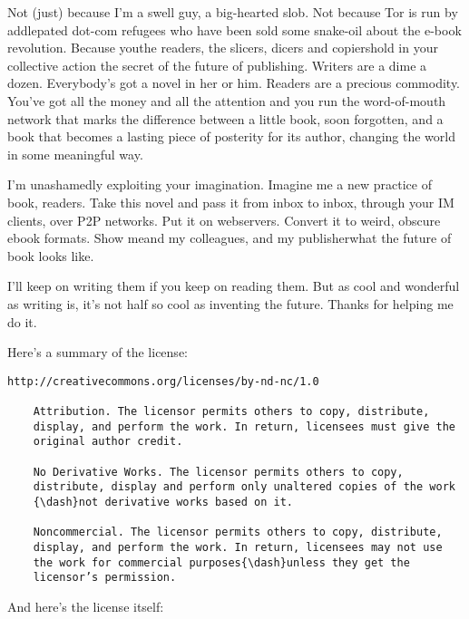 Not (just) because I’m a swell guy, a big-hearted slob. Not because
Tor is run by addlepated dot-com refugees who have been sold some
snake-oil about the e-book revolution. Because you{\dash}the readers, the
slicers, dicers and copiers{\dash}hold in your collective action the
secret of the future of publishing. Writers are a dime a dozen.
Everybody’s got a novel in her or him. Readers are a precious
commodity. You’ve got all the money and all the attention and you
run the word-of-mouth network that marks the difference between a
little book, soon forgotten, and a book that becomes a lasting
piece of posterity for its author, changing the world in some
meaningful way.

I’m unashamedly exploiting your imagination. Imagine me a new
practice of book, readers. Take this novel and pass it from inbox
to inbox, through your IM clients, over P2P networks. Put it on
webservers. Convert it to weird, obscure ebook formats. Show me{\dash}and
my colleagues, and my publisher{\dash}what the future of book looks
like.

I’ll keep on writing them if you keep on reading them. But as cool
and wonderful as writing is, it’s not half so cool as inventing the
future. Thanks for helping me do it.

Here’s a summary of the license:

\begin{Verbatim}[fontsize=\footnotesize]
    http://creativecommons.org/licenses/by-nd-nc/1.0
    
    Attribution. The licensor permits others to copy, distribute,
    display, and perform the work. In return, licensees must give the
    original author credit.
    
    No Derivative Works. The licensor permits others to copy,
    distribute, display and perform only unaltered copies of the work
    {\dash}not derivative works based on it.
    
    Noncommercial. The licensor permits others to copy, distribute,
    display, and perform the work. In return, licensees may not use
    the work for commercial purposes{\dash}unless they get the
    licensor’s permission.
\end{Verbatim}
And here’s the license itself:

